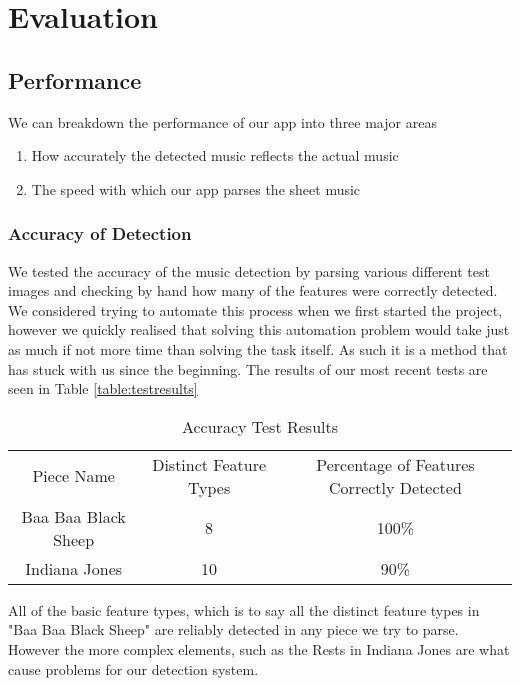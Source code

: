 \section{Evaluation}
    
    \subsection{Performance}
    We can breakdown the performance of our app into three major areas
        \begin{enumerate}
        \item{How accurately the detected music reflects the actual music}
        \item{The speed with which our app parses the sheet music}
        \end{enumerate}
        \subsubsection{Accuracy of Detection}
            We tested the accuracy of the music detection by parsing various different test images and checking by hand how many of the features were correctly detected. We considered trying to automate this process when we first started the project, however we quickly realised that solving this automation problem would take just as much if not more time than solving the task itself. As such it is a method that has stuck with us since the beginning.
            The results of our most recent tests are seen in Table \ref{table:testresults}
            \begin{table}[h!]
                \centering
                \begin{tabular}{ c | c | c }
                    Piece Name & Distinct Feature Types & Percentage of Features Correctly Detected \\
                    Baa Baa Black Sheep & 8 & 100\% \\
                    Indiana Jones & 10 & 90\%\\
                \end{tabular}
                \caption{Accuracy Test Results}
                \label{table:acctestresults}
            \end{table}
            
            All of the basic feature types, which is to say all the distinct feature types in "Baa Baa Black Sheep" are reliably detected in any piece we try to parse. However the more complex elements, such as the Rests in Indiana Jones are what cause problems for our detection system.
